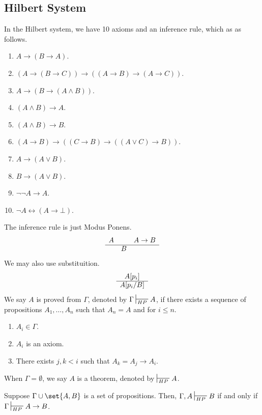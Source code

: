 \subsection{Hilbert System}
In the Hilbert system, we have 10 axioms and an inference rule, which as as follows.
\begin{enumerate}
    \item \(A \to (B \to A)\).
    \item \((A \to (B \to C)) \to ((A \to B) \to (A \to C))\).
    \item \(A \to (B \to (A \land B))\).
    \item \((A \land B) \to A\).
    \item \((A \land B) \to B\).
    \item \((A \to B) \to ((C\to B) \to ((A \lor C) \to B))\).
    \item \(A \to (A \lor B)\).
    \item \(B \to (A \lor B)\).
    \item \(\neg \neg A \to A\).
    \item \(\neg A \leftrightarrow (A \to \bot)\).
\end{enumerate}
The inference rule is just Modus Ponens.
\begin{equation}
    \begin{array}{ccc} 
        A  & & A \to B  \\
        \cline{1-3}
        & B &
    \end{array}
\end{equation}
We may also use substituition.
\begin{equation}
    \begin{array}{c} 
        A[p_i] \\
        \cline{1-1}
        A[p_i/B]
    \end{array}
\end{equation}
We say \(A\) is proved from \(\Gamma\), denoted by \(\Gamma \sststile{HP}{} A\), if there exists a sequence of propositions \(A_1,\dots,A_n\) such that \(A_n = A\) and for \(i \leq n\).
\begin{enumerate}
    \item  \(A_i \in \Gamma\).
    \item \(A_i\) is an axiom.
    \item There exists \(j,k < i\) such that \(A_k = A_j \to A_i\).
\end{enumerate}
When \(\Gamma = \emptyset\), we say \(A\) is a theorem, denoted by \(\sststile{HP}{} A\).
\begin{theorem}
    Suppose \(\Gamma \cup \set{A,B}\) is a set of propositions. Then, \(\Gamma,A \sststile{HP}{} B\) if and only if \(\Gamma \sststile{HP}{} A \to B\).
\end{theorem}
